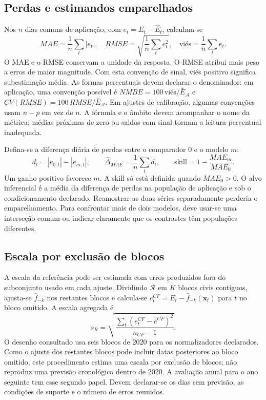 \subsection{Perdas e estimandos emparelhados}
\label{sec:mat-perdas}
Nos $n$ dias comuns de aplicação, com $e_t=E_t-\widehat E_t$, calculam-se
\begin{equation}
MAE=\frac1n\sum_t|e_t|,
\quad RMSE=\sqrt{\frac1n\sum_te_t^2},
\quad \mathrm{viés}=\frac1n\sum_te_t.
\label{eq:mat-perdas}
\end{equation}
O MAE e o RMSE conservam a unidade da resposta. O RMSE atribui mais peso a erros de maior magnitude. Com esta convenção de sinal, viés positivo significa subestimação média. As formas percentuais devem declarar o denominador: em aplicação, uma convenção possível é $NMBE=100\,\mathrm{viés}/\bar E_{\mathcal A}$ e $CV(RMSE)=100\,RMSE/\bar E_{\mathcal A}$. Em ajustes de calibração, algumas convenções usam $n-p$ em vez de $n$. A fórmula e o âmbito devem acompanhar o nome da métrica; médias próximas de zero ou saldos com sinal tornam a leitura percentual inadequada\parencite{HyndmanKoehler2006}.

Defina-se a diferença diária de perdas entre o comparador $0$ e o modelo $m$:
\begin{equation}
d_t=|e_{0,t}|-|e_{m,t}|,
\qquad \widehat\Delta_{MAE}=\frac1n\sum_td_t,
\qquad \mathrm{skill}=1-\frac{MAE_m}{MAE_0}.
\label{eq:mat-ganho}
\end{equation}
Um ganho positivo favorece $m$. A skill só está definida quando $MAE_0>0$. O alvo inferencial é a média da diferença de perdas na população de aplicação e sob o condicionamento declarado. Reamostrar as duas séries separadamente perderia o emparelhamento. Para confrontar mais de dois modelos, deve usar-se uma interseção comum ou indicar claramente que os contrastes têm populações diferentes.

\subsection{Escala por exclusão de blocos}
\label{sec:mat-crossfit}
A escala da referência pode ser estimada com erros produzidos fora do subconjunto usado em cada ajuste. Dividindo $\mathcal R$ em $K$ blocos civis contíguos, ajusta-se $\widehat f_{-k}$ nos restantes blocos e calcula-se $e_t^{CF}=E_t-\widehat f_{-k}(\boldsymbol x_t)$ para $t$ no bloco omitido. A escala agregada é
\begin{equation}
s_R=\sqrt{\frac{\sum_t(e_t^{CF}-\bar e^{CF})^2}{n_{CF}-1}}.
\label{eq:mat-crossfit}
\end{equation}
O desenho consultado usa seis blocos de 2020 para os normalizadores declarados. Como o ajuste dos restantes blocos pode incluir datas posteriores ao bloco omitido, este procedimento estima uma escala por exclusão de blocos; não reproduz uma previsão cronológica dentro de 2020. A avaliação anual para o ano seguinte tem esse segundo papel. Devem declarar-se os dias sem previsão, as condições de suporte e o número de erros reunidos.


